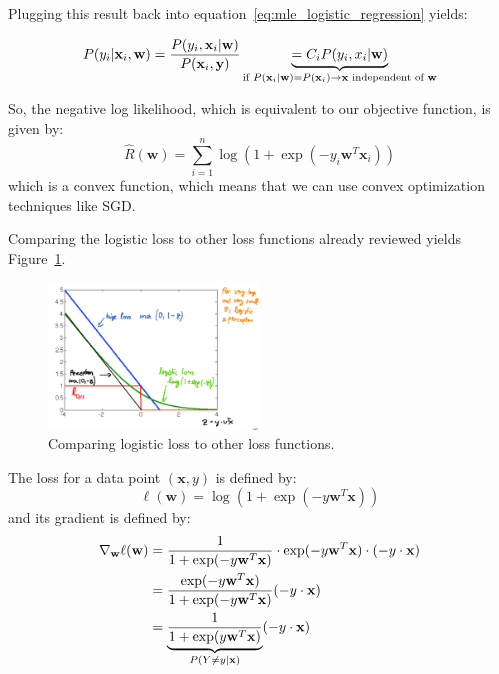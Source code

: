 \documentclass[a4paper,10pt,twoside]{article}
\begin{document}
Plugging this result back into equation~\ref{eq:mle_logistic_regression} yields:

\begin{equation*}
  P(y_i|\mathbf{x}_i,\mathbf{w}) = {P(y_i,\mathbf{x}_i|\mathbf{w})\over P(\mathbf{x}_i,\mathbf{y})} \underbrace{= C_i P(y_i,x_i|\mathbf{w})}_{\text{if }P(\mathbf{x}_i|\mathbf{w})=P(\mathbf{x}_i)\rightarrow \mathbf{x}\text{ independent of }\mathbf{w}}
\end{equation*}

So, the negative log likelihood, which is equivalent to our objective function, is given by:
\begin{equation*}
  \hat{R}(\mathbf{w})=\sum_{i=1}^{n}\log(1+\exp(-y_i\mathbf{w}^T\mathbf{x}_i))
\end{equation*}
which is a convex function, which means that we can use convex optimization techniques like SGD.

Comparing the logistic loss to other loss functions already reviewed yields Figure~\ref{fig:comparison_loss_function}.

\begin{figure}
  \centering
  \includegraphics[width=0.5\textwidth]{figures/loss_functions.png}
  \caption{Comparing logistic loss to other loss functions.}
  \label{fig:comparison_loss_function}
\end{figure}

The loss for a data point $(\mathbf{x},y)$ is defined by:
\begin{equation*}
  \ell(\mathbf{w}) = \log(1+\exp(-y\mathbf{w}^T\mathbf{x}))
\end{equation*}
and its gradient is defined by:
\begin{align*}
  \nabla_{\mathbf{w}}\ell(\mathbf{w}) &= {1\over 1+\exp(-y\mathbf{w}^T\mathbf{x})}\cdot\exp(-y\mathbf{w}^T\mathbf{x})\cdot (-y\cdot\mathbf{x})\\
  &= {\exp(-y\mathbf{w}^T\mathbf{x})\over 1 + \exp(-y\mathbf{w}^T\mathbf{x})}(-y\cdot\mathbf{x})\\
  &= \underbrace{{1\over 1 + \exp(y\mathbf{w}^T\mathbf{x})}}_{P(Y\neq y|\mathbf{x})}(-y\cdot\mathbf{x})
\end{align*}
\end{document}
